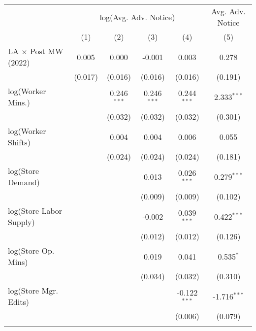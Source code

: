 
\begingroup
\centering
\scriptsize
\begin{tabular}{lccccc}
   \toprule
    & \multicolumn{4}{c}{log(Avg. Adv. Notice)} & Avg. Adv. Notice\\
                               & (1)           & (2)           & (3)           & (4)            & (5)\\  
   \midrule 
   LA $\times$ Post MW (2022)  & 0.005         & 0.000         & -0.001        & 0.003          & 0.278\\   
                               & (0.017)       & (0.016)       & (0.016)       & (0.016)        & (0.191)\\   
   log(Worker Mins.)                  &               & 0.246$^{***}$ & 0.246$^{***}$ & 0.244$^{***}$  & 2.333$^{***}$\\   
                               &               & (0.032)       & (0.032)       & (0.032)        & (0.301)\\   
   log(Worker Shifts)                 &               & 0.004         & 0.004         & 0.006          & 0.055\\   
                               &               & (0.024)       & (0.024)       & (0.024)        & (0.181)\\   
   log(Store Demand)           &               &               & 0.013         & 0.026$^{***}$  & 0.279$^{***}$\\   
                               &               &               & (0.009)       & (0.009)        & (0.102)\\   
   log(Store Labor Supply)     &               &               & -0.002        & 0.039$^{***}$  & 0.422$^{***}$\\   
                               &               &               & (0.012)       & (0.012)        & (0.126)\\   
   log(Store Op. Mins)         &               &               & 0.019         & 0.041          & 0.535$^{*}$\\   
                               &               &               & (0.034)       & (0.032)        & (0.310)\\   
   log(Store Mgr. Edits)       &               &               &               & -0.122$^{***}$ & -1.716$^{***}$\\   
                               &               &               &               & (0.006)        & (0.079)\\   
    \\

\end{tabular}
